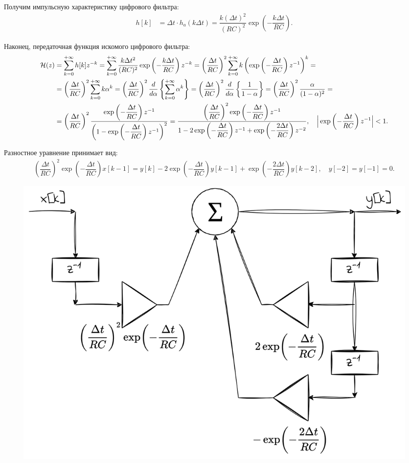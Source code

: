 Получим импульсную характеристику цифрового фильтра:
\begin{align*}
	h[k] &= \Delta t \cdot h_a(k \Delta t) = \dfrac{k (\Delta t)^2}{(RC)^2} \exp\left(-\dfrac{k \Delta t}{RC}\right).
\end{align*}

Наконец, передаточная функция искомого цифрового фильтра:
\begin{align*}
	\mathcal{H}(z) &= \sum \limits_{k=0}^{+\infty}h[k]z^{-k} = \sum \limits_{k=0}^{+\infty} \dfrac{k \Delta t^2}{(RC)^2} \exp\left(-\dfrac{k \Delta t}{RC}\right) z^{-k} = \left(\dfrac{\Delta t}{RC}\right)^2 \sum \limits_{k=0}^{+\infty} k
	\left(\exp\left(-\dfrac{\Delta t}{RC}\right) z^{-1} \right)^k = \\ &=
	\left(\dfrac{\Delta t}{RC}\right)^2 \sum \limits_{k=0}^{+\infty} k \alpha^k = 
	\left(\dfrac{\Delta t}{RC}\right)^2 \dfrac{d}{d\alpha} \left\{ \sum \limits_{k=0}^{+\infty} \alpha^k \right\} =
	\left(\dfrac{\Delta t}{RC}\right)^2 \dfrac{d}{d\alpha} \left\{\dfrac{1}{1 - \alpha} \right\} =
	\left(\dfrac{\Delta t}{RC}\right)^2 \dfrac{\alpha}{(1 - \alpha)^2} = \\ &=
	\left(\dfrac{\Delta t}{RC}\right)^2 \dfrac{\exp\left(-\dfrac{\Delta t}{RC}\right) z^{-1} }{\left(1 - \exp\left(-\dfrac{\Delta t}{RC}\right) z^{-1} \right)^2} =
	\dfrac{\left(\dfrac{\Delta t}{RC}\right)^2 \exp\left(-\dfrac{\Delta t}{RC}\right) z^{-1}}{1 - 2\exp\left(-\dfrac{\Delta t}{RC}\right) z^{-1} + \exp\left(-\dfrac{2\Delta t}{RC}\right) z^{-2}}, \quad \Big|\exp\left(-\dfrac{\Delta t}{RC}\right) z^{-1}\Big| < 1.
\end{align*}

Разностное уравнение принимает вид:
\begin{align*}
	\left(\dfrac{\Delta t}{RC}\right)^2 \exp\left(-\dfrac{\Delta t}{RC}\right) x[k-1] = y[k] - 2\exp\left(-\dfrac{\Delta t}{RC}\right) y[k-1] + \exp\left(-\dfrac{2\Delta t}{RC}\right) y[k-2],\quad y[-2] = y[-1] = 0.
\end{align*}

\begin{figure}[!h]
	\centering
	\includegraphics[width=0.75\columnwidth]{pics/fall/11/11-1.png}
	\label{fig:11-1}
\end{figure}


